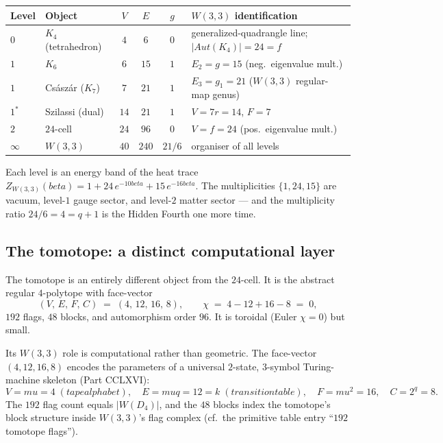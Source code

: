 \documentclass[11pt]{article}
\def\mathrm#1{#1}%
\def\textbf#1{#1}%
\def\text#1{#1}%
\def\beta{beta}%
\def\mu{mu}%
\begin{document}
\begin{center}
\renewcommand{\arraystretch}{1.2}
\begin{tabular}{l l c c c l}
\toprule
Level & Object & $V$ & $E$ & $g$ & $W(3,3)$ identification \\
\midrule
$0$ & $K_4$ (tetrahedron) & $4$ & $6$ & $0$ & generalized-quadrangle line; $|\mathrm{Aut}(K_4)|=24=f$ \\
$1$ & $K_6$ & $6$ & $15$ & $1$ & $E_2 = g = 15$ (neg.\ eigenvalue mult.) \\
$1$ & Császár ($K_7$) & $7$ & $21$ & $1$ & $E_3 = g_1 = 21$ ($W(3,3)$ regular-map genus) \\
$1^*$ & Szilassi (dual) & $14$ & $21$ & $1$ & $V = 7r = 14$, $F = 7$ \\
$2$ & $24$-cell & $24$ & $96$ & $0$ & $V = f = 24$ (pos.\ eigenvalue mult.) \\
$\infty$ & $W(3,3)$ & $40$ & $240$ & $21/6$ & organiser of all levels \\
\bottomrule
\end{tabular}
\end{center}

Each level is an energy band of the heat trace $Z_{W(3,3)}(\beta) = 1 + 24\,e^{-10\beta} + 15\,e^{-16\beta}$. The multiplicities $\{1, 24, 15\}$ are vacuum, level-$1$ gauge sector, and level-$2$ matter sector --- and the multiplicity ratio $24/6 = 4 = q+1$ is the Hidden Fourth one more time.

\subsection*{The tomotope: a distinct computational layer}

The \textbf{tomotope} is an entirely different object from the $24$-cell. It is the abstract regular $4$-polytope with face-vector
\[
(V,\,E,\,F,\,C) \;=\; (4,\,12,\,16,\,8), \qquad \chi \;=\; 4 - 12 + 16 - 8 \;=\; 0,
\]
$192$ flags, $48$ blocks, and automorphism order $96$. It is toroidal (Euler $\chi = 0$) but small.

Its $W(3,3)$ role is computational rather than geometric. The face-vector $(4, 12, 16, 8)$ encodes the parameters of a universal $2$-state, $3$-symbol Turing-machine skeleton (Part CCLXVI):
\[
V = \mu = 4 \;(\text{tape alphabet}),\quad
E = \mu q = 12 = k \;(\text{transition table}),\quad
F = \mu^2 = 16,\quad
C = 2^q = 8.
\]
The $192$ flag count equals $|W(D_4)|$, and the $48$ blocks index the tomotope's block structure inside $W(3,3)$'s flag complex (cf.\ the primitive table entry ``$192$ tomotope flags'').
\end{document}
